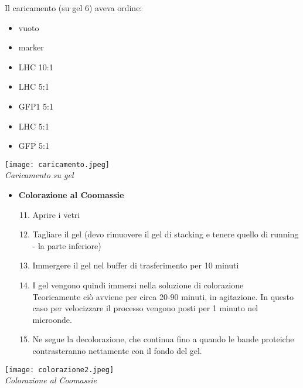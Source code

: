 \documentclass{extarticle}
\begin{document}
\begin{minipage}[c]{0.5\textwidth}
    Il caricamento (su gel 6) aveva ordine:
    \begin{itemize}
        \item vuoto
        \item marker
        \item LHC 10:1
        \item LHC 5:1
        \item GFP1 5:1
        \item LHC 5:1
        \item GFP 5:1
    \end{itemize}
\end{minipage} \hfill
\begin{minipage}[c]{0.5\textwidth}
    \begin{center}
        \texttt{[image: caricamento.jpeg]}\\
        \emph{Caricamento su gel}
    \end{center}
\end{minipage}
\begin{minipage}[c]{0.5\textwidth}
    \begin{itemize}
        \item \textbf{Colorazione al Coomassie}\\
        \begin{enumerate}
            \setcounter{enumi}{10}
            \item Aprire i vetri 
            \item Tagliare il gel (devo rimuovere il gel di stacking e tenere quello di running - la parte inferiore)
            \item Immergere il gel nel buffer di trasferimento per 10 minuti
            \item I gel vengono quindi immersi nella soluzione di colorazione\\
            Teoricamente ciò avviene per circa 20-90 minuti, in agitazione. In questo caso per velocizzare il processo vengono posti per 1 minuto nel microonde.
            \item Ne segue la decolorazione, che continua fino a quando le bande proteiche contrasteranno nettamente con il fondo del gel.
        \end{enumerate}
    \end{itemize}
\end{minipage} \hfill
\begin{minipage}[c]{0.5\textwidth}
    \begin{center}
        \texttt{[image: colorazione2.jpeg]}\\
        \emph{Colorazione al Coomassie}
    \end{center}
\end{minipage}
\end{document}
